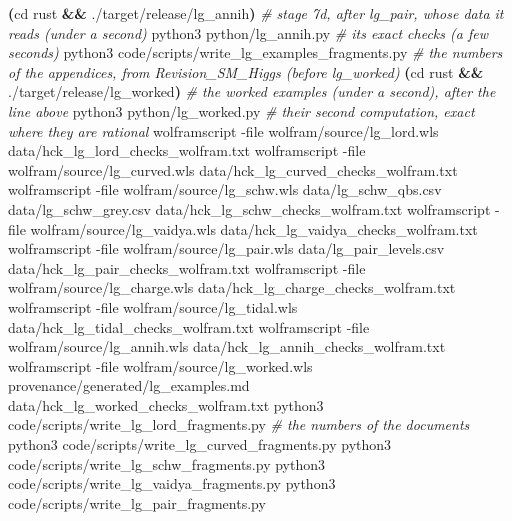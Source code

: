 \documentclass[
  10pt,
]{article}
\newenvironment{Shaded}{}{}
\newcommand{\AttributeTok}[1]{\textcolor[rgb]{0.49,0.56,0.16}{#1}}
\newcommand{\BuiltInTok}[1]{\textcolor[rgb]{0.00,0.50,0.00}{#1}}
\newcommand{\CommentTok}[1]{\textcolor[rgb]{0.38,0.63,0.69}{\textit{#1}}}
\newcommand{\ExtensionTok}[1]{#1}
\newcommand{\KeywordTok}[1]{\textcolor[rgb]{0.00,0.44,0.13}{\textbf{#1}}}
\newcommand{\NormalTok}[1]{#1}
\begin{document}
\begin{Shaded}
\begin{Highlighting}[]
\KeywordTok{(}\BuiltInTok{cd}\NormalTok{ rust }\KeywordTok{\&\&} \ExtensionTok{./target/release/lg\_annih}\KeywordTok{)}         \CommentTok{\# stage 7d, after lg\_pair, whose data it reads (under a second)}
\ExtensionTok{python3}\NormalTok{ python/lg\_annih.py                     }\CommentTok{\# its exact checks (a few seconds)}
\ExtensionTok{python3}\NormalTok{ code/scripts/write\_lg\_examples\_fragments.py   }\CommentTok{\# the numbers of the appendices, from Revision\_SM\_Higgs (before lg\_worked)}
\KeywordTok{(}\BuiltInTok{cd}\NormalTok{ rust }\KeywordTok{\&\&} \ExtensionTok{./target/release/lg\_worked}\KeywordTok{)}        \CommentTok{\# the worked examples (under a second), after the line above}
\ExtensionTok{python3}\NormalTok{ python/lg\_worked.py                    }\CommentTok{\# their second computation, exact where they are rational}
\ExtensionTok{wolframscript} \AttributeTok{{-}file}\NormalTok{ wolfram/source/lg\_lord.wls data/hck\_lg\_lord\_checks\_wolfram.txt}
\ExtensionTok{wolframscript} \AttributeTok{{-}file}\NormalTok{ wolfram/source/lg\_curved.wls data/hck\_lg\_curved\_checks\_wolfram.txt}
\ExtensionTok{wolframscript} \AttributeTok{{-}file}\NormalTok{ wolfram/source/lg\_schw.wls data/lg\_schw\_qbs.csv data/lg\_schw\_grey.csv data/hck\_lg\_schw\_checks\_wolfram.txt}
\ExtensionTok{wolframscript} \AttributeTok{{-}file}\NormalTok{ wolfram/source/lg\_vaidya.wls data/hck\_lg\_vaidya\_checks\_wolfram.txt}
\ExtensionTok{wolframscript} \AttributeTok{{-}file}\NormalTok{ wolfram/source/lg\_pair.wls data/lg\_pair\_levels.csv data/hck\_lg\_pair\_checks\_wolfram.txt}
\ExtensionTok{wolframscript} \AttributeTok{{-}file}\NormalTok{ wolfram/source/lg\_charge.wls data/hck\_lg\_charge\_checks\_wolfram.txt}
\ExtensionTok{wolframscript} \AttributeTok{{-}file}\NormalTok{ wolfram/source/lg\_tidal.wls data/hck\_lg\_tidal\_checks\_wolfram.txt}
\ExtensionTok{wolframscript} \AttributeTok{{-}file}\NormalTok{ wolfram/source/lg\_annih.wls data/hck\_lg\_annih\_checks\_wolfram.txt}
\ExtensionTok{wolframscript} \AttributeTok{{-}file}\NormalTok{ wolfram/source/lg\_worked.wls provenance/generated/lg\_examples.md data/hck\_lg\_worked\_checks\_wolfram.txt}
\ExtensionTok{python3}\NormalTok{ code/scripts/write\_lg\_lord\_fragments.py   }\CommentTok{\# the numbers of the documents}
\ExtensionTok{python3}\NormalTok{ code/scripts/write\_lg\_curved\_fragments.py}
\ExtensionTok{python3}\NormalTok{ code/scripts/write\_lg\_schw\_fragments.py}
\ExtensionTok{python3}\NormalTok{ code/scripts/write\_lg\_vaidya\_fragments.py}
\ExtensionTok{python3}\NormalTok{ code/scripts/write\_lg\_pair\_fragments.py}

\end{Highlighting}
\end{Shaded}
\end{document}
